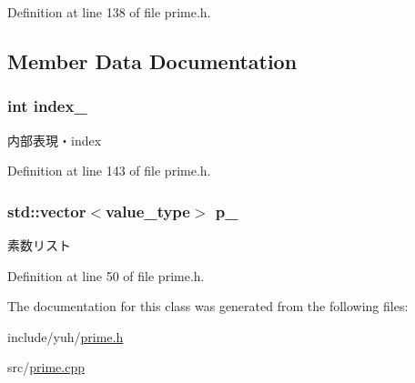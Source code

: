 \-Definition at line 138 of file prime.\-h.



\subsection{\-Member \-Data \-Documentation}
\hypertarget{classyuh_1_1range__detail_1_1prime__iterator_aaaf1ac02dfa554a3cdffc647d512a77b}{
\subsubsection[{index\-\_\-}]{\setlength{\rightskip}{0pt plus 5cm}int {\bf index\-\_\-}}}\label{d9/dc8/classyuh_1_1range__detail_1_1prime__iterator_aaaf1ac02dfa554a3cdffc647d512a77b}
内部表現・index 

\-Definition at line 143 of file prime.\-h.

\hypertarget{classyuh_1_1range__detail_1_1prime__iterator_aff6d0a0fbc14123c0fca5a0c05d2e68c}{
\subsubsection[{p\-\_\-}]{\setlength{\rightskip}{0pt plus 5cm}std\-::vector$<${\bf value\-\_\-type}$>$ {\bf p\-\_\-}}}\label{d9/dc8/classyuh_1_1range__detail_1_1prime__iterator_aff6d0a0fbc14123c0fca5a0c05d2e68c}
素数リスト 

\-Definition at line 50 of file prime.\-h.



\-The documentation for this class was generated from the following files\-:\begin{DoxyCompactItemize}
\item 
include/yuh/\hyperlink{prime_8h}{prime.\-h}\item 
src/\hyperlink{prime_8cpp}{prime.\-cpp}\end{DoxyCompactItemize}

